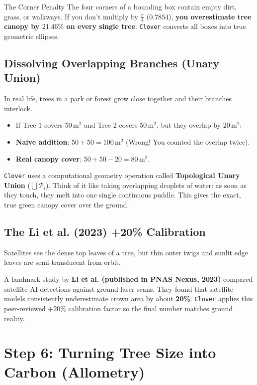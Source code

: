\documentclass[11pt,a4paper]{article}
\begin{document}
\begin{plainbox}{The Corner Penalty}
The four corners of a bounding box contain empty dirt, grass, or walkways. If you don't multiply by $\frac{\pi}{4}$ ($0.7854$), \textbf{you overestimate tree canopy by $21.46\%$ on every single tree}. \texttt{Clover} converts all boxes into true geometric ellipses.
\end{plainbox}

\subsection{Dissolving Overlapping Branches (Unary Union)}
In real life, trees in a park or forest grow close together and their branches interlock.
\begin{itemize}
    \item If Tree 1 covers $50\,\text{m}^2$ and Tree 2 covers $50\,\text{m}^2$, but they overlap by $20\,\text{m}^2$:
    \item \textbf{Naive addition}: $50 + 50 = 100\,\text{m}^2$ (Wrong! You counted the overlap twice).
    \item \textbf{Real canopy cover}: $50 + 50 - 20 = 80\,\text{m}^2$.
\end{itemize}

\texttt{Clover} uses a computational geometry operation called \textbf{Topological Unary Union} ($\bigcup \mathcal{P}_i$). Think of it like taking overlapping droplets of water: as soon as they touch, they melt into one single continuous puddle. This gives the exact, true green canopy cover over the ground.

\subsection{The Li et al. (2023) +20\% Calibration}
Satellites see the dense top leaves of a tree, but thin outer twigs and sunlit edge leaves are semi-translucent from orbit. 

A landmark study by \textbf{Li et al. (published in PNAS Nexus, 2023)} compared satellite AI detections against ground laser scans. They found that satellite models consistently underestimate crown area by about \textbf{20\%}. \texttt{Clover} applies this peer-reviewed $+20\%$ calibration factor so the final number matches ground reality.

\section{Step 6: Turning Tree Size into Carbon (Allometry)}
\end{document}

